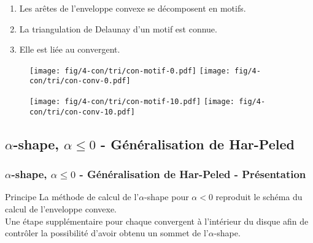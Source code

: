 \begin{frame}
{
  \begin{block}{}
	  \begin{enumerate}
		\item Les arêtes de l'enveloppe convexe se décomposent en motifs.
		\item La triangulation de Delaunay d'un motif est connue.
	  \item<3> Elle est liée au convergent.
	  \end{enumerate}
  \end{block}

}
{
	\begin{figure}[H]
	  \centering
	  \texttt{[image: fig/4-con/tri/con-motif-0.pdf]}
	  \texttt{[image: fig/4-con/tri/con-conv-0.pdf]}
	\end{figure}
}
{
	\begin{figure}[H]
	  \centering
	  \texttt{[image: fig/4-con/tri/con-motif-10.pdf]}
	  \texttt{[image: fig/4-con/tri/con-conv-10.pdf]}
	\end{figure}
}

\end{frame}


\subsection{$\alpha$-shape, $\alpha \leq 0$ - Généralisation de Har-Peled}

\begin{frame}
\frametitle{$\alpha$-shape, $\alpha \leq 0$ - Généralisation de Har-Peled - Présentation}

\begin{block}{Principe}
  La méthode de calcul de l'$\alpha$-shape pour $\alpha <0$ reproduit le schéma du calcul de l’enveloppe convexe.\\ 
  Une étape supplémentaire pour chaque convergent à l'intérieur du disque afin de contrôler la possibilité d'avoir obtenu un sommet de l'$\alpha$-shape.

\end{block}

\end{frame}

